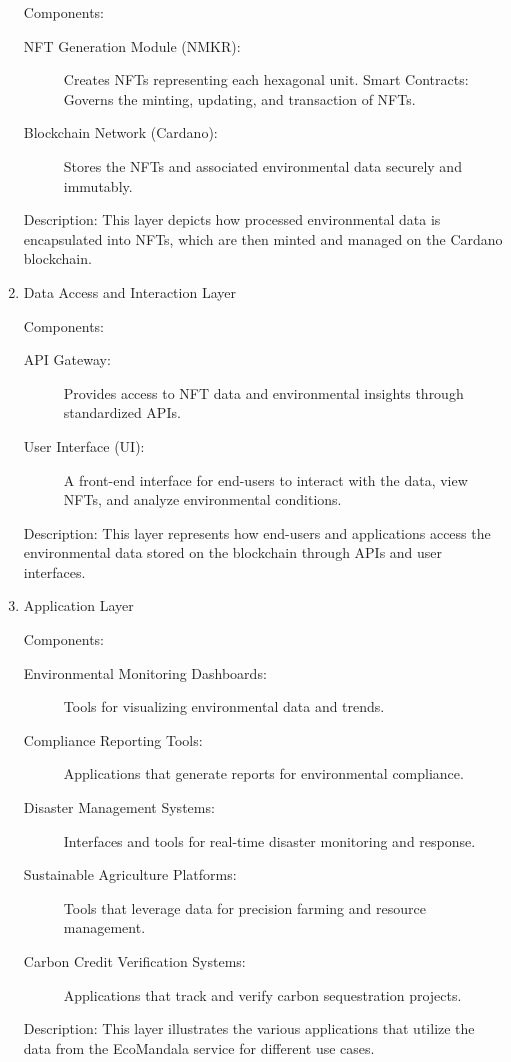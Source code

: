 \documentclass{scrreport}
\begin{document}
\begin{enumerate}
    Components:
    \begin{description}
        \item[NFT Generation Module (NMKR):] Creates NFTs representing each hexagonal unit.
Smart Contracts: Governs the minting, updating, and transaction of NFTs.
        \item[Blockchain Network (Cardano):] Stores the NFTs and associated environmental data securely and immutably.
    \end{description}
    Description: This layer depicts how processed environmental data is encapsulated into NFTs, which are then minted and managed on the Cardano blockchain.

    \item{Data Access and Interaction Layer}

    Components:
    \begin{description}
        \item[API Gateway:] Provides access to NFT data and environmental insights through standardized APIs.
        \item[User Interface (UI):] A front-end interface for end-users to interact with the data, view NFTs, and analyze environmental conditions.
    \end{description}
    Description: This layer represents how end-users and applications access the environmental data stored on the blockchain through APIs and user interfaces.

    \item Application Layer

    Components:
    \begin{description}
        \item[Environmental Monitoring Dashboards:] Tools for visualizing environmental data and trends.
        \item[Compliance Reporting Tools:] Applications that generate reports for environmental compliance.
        \item[Disaster Management Systems:] Interfaces and tools for real-time disaster monitoring and response.
        \item[Sustainable Agriculture Platforms:] Tools that leverage data for precision farming and resource management.
        \item[Carbon Credit Verification Systems:] Applications that track and verify carbon sequestration projects.
    \end{description} 
    Description: This layer illustrates the various applications that utilize the data from the EcoMandala service for different use cases.

\end{enumerate}
\end{document}
